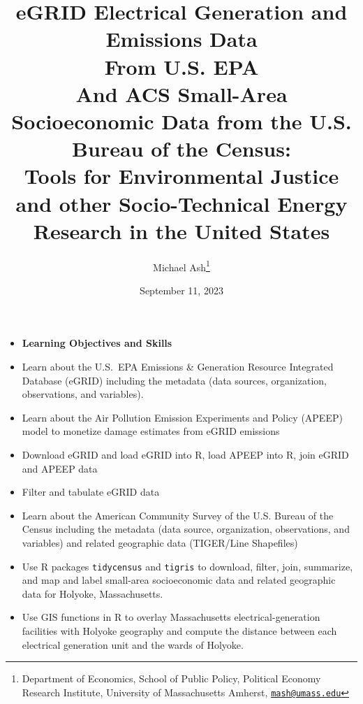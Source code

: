 \documentclass[fleqn, 12pt]{exam}
\title{eGRID Electrical Generation and Emissions Data\\ From U.S. EPA\\ And ACS Small-Area Socioeconomic Data from the U.S. Bureau of the Census:\\
Tools for Environmental Justice and other Socio-Technical Energy Research in the United States}
\author{Michael Ash\thanks{Department of Economics, School of Public Policy, Political Economy Research Institute, University of Massachusetts Amherst, \href{mailto:mash@umass.edu}{\tt mash@umass.edu}}}
\date{September 11, 2023}
\begin{document}
\maketitle
\thispagestyle{empty}

\begin{center}
\end{center}


  \begin{itemize}
  \item \textbf{Learning Objectives and Skills}
  \item Learn about the U.S.~EPA Emissions \& Generation Resource Integrated Database (eGRID) including the metadata (data sources, organization, observations, and variables).
  \item Learn about the Air Pollution Emission Experiments and Policy (APEEP) model to monetize damage estimates from eGRID emissions
  \item Download eGRID and load eGRID into R, load APEEP into R, join eGRID and APEEP data
  \item Filter and tabulate eGRID data
  \item Learn about the American Community Survey of the U.S. Bureau of the Census including the metadata (data source, organization, observations, and variables) and related geographic data (TIGER/Line Shapefiles)
  \item Use R packages \texttt{tidycensus} and \texttt{tigris} to download, filter, join, summarize, and map and label small-area socioeconomic data and related geographic data for Holyoke, Massachusetts. 
  \item Use GIS functions in R to overlay Massachusetts electrical-generation facilities with Holyoke geography and compute the distance between each electrical generation unit and the wards of Holyoke. 
  \end{itemize}
\end{document}
